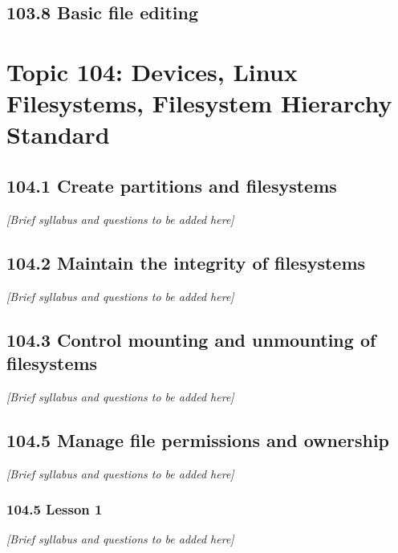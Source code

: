 \documentclass[12pt,a4paper]{report}
\begin{document}

\section*{103.8 Basic file editing}




\chapter{Topic 104: Devices, Linux Filesystems, Filesystem Hierarchy Standard}

\section{104.1 Create partitions and filesystems}
\textit{[Brief syllabus and questions to be added here]}

\section{104.2 Maintain the integrity of filesystems}
\textit{[Brief syllabus and questions to be added here]}

\section{104.3 Control mounting and unmounting of filesystems}
\textit{[Brief syllabus and questions to be added here]}

\section{104.5 Manage file permissions and ownership}
\textit{[Brief syllabus and questions to be added here]}

\subsection*{104.5 Lesson 1}
\textit{[Brief syllabus and questions to be added here]}
\end{document}
